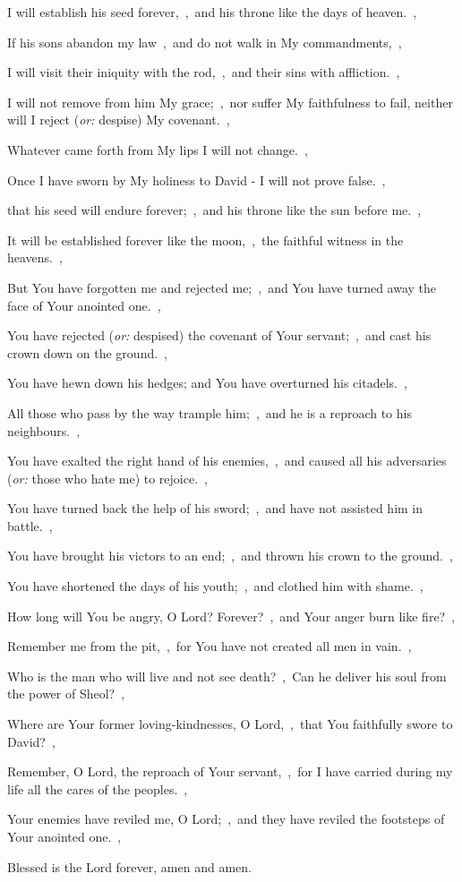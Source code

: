 \documentclass[12pt,twoside,a5paper]{article}
\newcommand{\translationoption}[1]{\emph{or:} #1}
\begin{document}
\begin{normalparskip}
  I will establish his seed forever,~\sep\ and his throne like the days of heaven.~\sep

  If his sons abandon my law~\sep\ and do not walk in My commandments,~\sep

  I will visit their iniquity with the rod,~\sep\ and their sins with affliction.~\sep

  I will not remove from him My grace;~\sep\ nor suffer My faithfulness to fail, neither will I reject (\translationoption{despise}) My covenant.~\sep

  Whatever came forth from My lips I will not change.~\sep

  Once I have sworn by My holiness to David - I will not prove false.~\sep

  that his seed will endure forever;~\sep\ and his throne like the sun before me.~\sep

  It will be established forever like the moon,~\sep\ the faithful witness in the heavens.~\sep

  But You have forgotten me and rejected me;~\sep\ and You have turned away the face of Your anointed one.~\sep

  You have rejected (\translationoption{despised}) the covenant of Your servant;~\sep\ and cast his crown down on the ground.~\sep

  You have hewn down his hedges; and You have overturned his citadels.~\sep

  All those who pass by the way trample him;~\sep\ and he is a reproach to his neighbours.~\sep

  You have exalted the right hand of his enemies,~\sep\ and caused all his adversaries (\translationoption{those who hate me}) to rejoice.~\sep

  You have turned back the help of his sword;~\sep\ and have not assisted him in battle.~\sep

  You have brought his victors to an end;~\sep\ and thrown his crown to the ground.~\sep

  You have shortened the days of his youth;~\sep\ and clothed him with shame.~\sep

  How long will You be angry, O Lord? Forever?~\sep\ and Your anger burn like fire?~\sep

  Remember me from the pit,~\sep\ for You have not created all men in vain.~\sep

  Who is the man who will live and not see death?~\sep\ Can he deliver his soul from the power of Sheol?~\sep

  Where are Your former loving-kindnesses, O Lord,~\sep\ that You faithfully swore to David?~\sep

  Remember, O Lord, the reproach of Your servant,~\sep\ for I have carried during my life all the cares of the peoples.~\sep

  Your enemies have reviled me, O Lord;~\sep\ and they have reviled the footsteps of Your anointed one.~\sep

  Blessed is the Lord forever, amen and amen.
\end{normalparskip}
\end{document}
